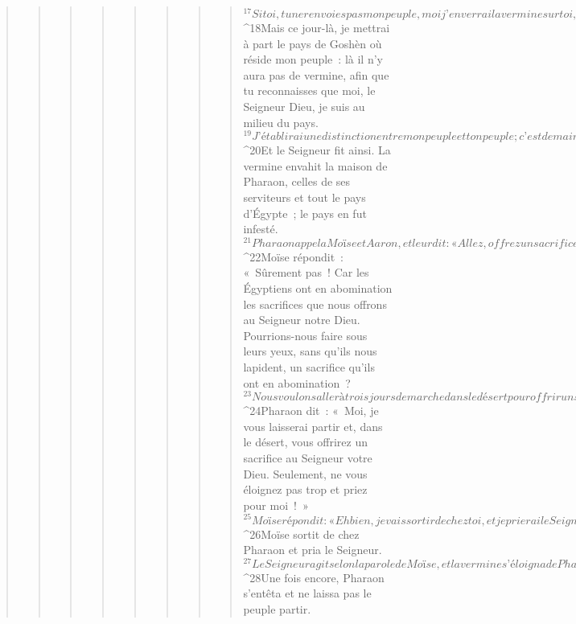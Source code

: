 \begin{verse}
\begin{verse}
\begin{verse}
\begin{verse}
\begin{verse}
\begin{verse}
\begin{verse}
\begin{verse}
${}^{17}Si toi, tu ne renvoies pas mon peuple, moi j’enverrai la vermine sur toi, sur tes serviteurs, sur ton peuple et dans tes maisons. Les maisons des Égyptiens seront pleines de vermine, et même le sol qu’ils foulent en sera couvert. 
${}^{18}Mais ce jour-là, je mettrai à part le pays de Goshèn où réside mon peuple : là il n’y aura pas de vermine, afin que tu reconnaisses que moi, le Seigneur Dieu, je suis au milieu du pays. 
${}^{19}J’établirai une distinction entre mon peuple et ton peuple ; c’est demain qu’aura lieu ce signe. » 
${}^{20}Et le Seigneur fit ainsi. La vermine envahit la maison de Pharaon, celles de ses serviteurs et tout le pays d’Égypte ; le pays en fut infesté.
${}^{21}Pharaon appela Moïse et Aaron, et leur dit : « Allez, offrez un sacrifice à votre Dieu, mais ici, dans le pays. » 
${}^{22}Moïse répondit : « Sûrement pas ! Car les Égyptiens ont en abomination les sacrifices que nous offrons au Seigneur notre Dieu. Pourrions-nous faire sous leurs yeux, sans qu’ils nous lapident, un sacrifice qu’ils ont en abomination ? 
${}^{23}Nous voulons aller à trois jours de marche dans le désert pour offrir un sacrifice au Seigneur notre Dieu, selon ce qu’il nous dira. » 
${}^{24}Pharaon dit : « Moi, je vous laisserai partir et, dans le désert, vous offrirez un sacrifice au Seigneur votre Dieu. Seulement, ne vous éloignez pas trop et priez pour moi ! » 
${}^{25}Moïse répondit : « Eh bien, je vais sortir de chez toi, et je prierai le Seigneur. Demain, Pharaon, ses serviteurs et son peuple seront débarrassés de la vermine. Mais, que Pharaon cesse de se moquer de nous, en refusant de laisser partir le peuple afin qu’il offre un sacrifice au Seigneur ! »
${}^{26}Moïse sortit de chez Pharaon et pria le Seigneur. 
${}^{27}Le Seigneur agit selon la parole de Moïse, et la vermine s’éloigna de Pharaon, de ses serviteurs et de son peuple ; il n’en resta plus. 
${}^{28}Une fois encore, Pharaon s’entêta et ne laissa pas le peuple partir.
      

\end{verse}
\end{verse}
\end{verse}
\end{verse}
\end{verse}
\end{verse}
\end{verse}
\end{verse}

